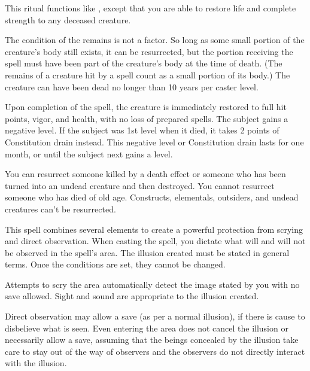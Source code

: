 \begin{spelleffect}
This ritual functions like , except that you are able to restore life and complete strength to any deceased creature.
\par The condition of the remains is not a factor. So long as some small portion of the creature's body still exists, it can be resurrected, but the portion receiving the spell must have been part of the creature's body at the time of death. (The remains of a creature hit by a  spell count as a small portion of its body.) The creature can have been dead no longer than 10 years per caster level.
\par Upon completion of the spell, the creature is immediately restored to full hit points, vigor, and health, with no loss of prepared spells. The subject gains a negative level. If the subject was 1st level when it died, it takes 2 points of Constitution drain instead. This negative level or Constitution drain lasts for one month, or until the subject next gains a level.
\end{spelleffect}
\begin{spellnotes}
You can resurrect someone killed by a death effect or someone who has been turned into an undead creature and then destroyed. You cannot resurrect someone who has died of old age. Constructs, elementals, outsiders, and undead creatures can't be resurrected.
\end{spellnotes}

\spellrng{\rngclose}
\spelldur{\durext}
\begin{spelleffect}
This spell combines several elements to create a powerful protection from scrying and direct observation. When casting the spell, you dictate what will and will not be observed in the spell's area. The illusion created must be stated in general terms. Once the conditions are set, they cannot be changed.
\par Attempts to scry the area automatically detect the image stated by you with no save allowed. Sight and sound are appropriate to the illusion created.
\par Direct observation may allow a save (as per a normal illusion), if there is cause to disbelieve what is seen. Even entering the area does not cancel the illusion or necessarily allow a save, assuming that the beings concealed by the illusion take care to stay out of the way of observers and the observers do not directly interact with the illusion.
\end{spelleffect}

